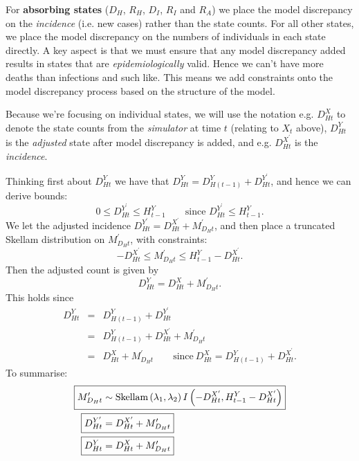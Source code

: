 \documentclass[a4paper]{article}
\begin{document}
For \textbf{absorbing states} ($D_H$, $R_H$, $D_I$, $R_I$ and $R_A$) we place the model discrepancy on the \textit{incidence} (i.e. new cases) rather than the state counts. For all other states, we place the model discrepancy on the numbers of individuals in each state directly. A key aspect is that we must ensure that any model discrepancy added results in states that are \textit{epidemiologically} valid. Hence we can't have more deaths than infections and such like. This means we add constraints onto the model discrepancy process based on the structure of the model.

Because we're focusing on individual states, we will use the notation e.g. $D^X_{Ht}$ to denote the state counts from the \textit{simulator} at time $t$ (relating to $X_t$ above), $D^Y_{Ht}$ is the \textit{adjusted} state after model discrepancy is added, and e.g. $D^{X^\prime}_{Ht}$ is the \textit{incidence}.

Thinking first about $D^Y_{Ht}$ we have that $D^Y_{Ht} = D^Y_{H(t - 1)} + D^{Y^\prime}_{Ht}$, and hence we can derive bounds:
\begin{equation*}
    0 \leq D^{Y^\prime}_{Ht} \leq H^Y_{t-1} \qquad \mbox{since $D^{Y^\prime}_{Ht} \leq H^Y_{t - 1}$}.
\end{equation*}
We let the adjusted incidence $D^{Y^\prime}_{Ht} = D^{X^\prime}_{Ht} + M^\prime_{D_Ht}$, and then place a truncated Skellam distribution on $M^\prime_{D_Ht}$, with constraints:
\begin{equation*}
    -D^{X^\prime}_{Ht} \leq M^\prime_{D_Ht} \leq H^Y_{t - 1} - D^{X^\prime}_{Ht}.
\end{equation*}
Then the adjusted count is given by
\begin{equation*}
    D^Y_{Ht} = D^X_{Ht} + M^\prime_{D_Ht}.
\end{equation*}
This holds since
\begin{eqnarray*}
    D^Y_{Ht} &=& D^Y_{H(t - 1)} + D^{Y^\prime}_{Ht}\\
    &=& D^Y_{H(t - 1)} + D^{X^\prime}_{Ht} + M^\prime_{D_Ht}\\
    &=& D^X_{Ht} + M^\prime_{D_Ht} \qquad \mbox{since}~D^X_{Ht} = D^Y_{H(t - 1)} + D^{X^\prime}_{Ht}.
\end{eqnarray*}
To summarise:
\begin{align*}
\Aboxed{M^\prime_{D_Ht} &\sim \mbox{Skellam}\left(\lambda_1, \lambda_2\right)I\left(-D^{X^\prime}_{Ht}, H^Y_{t - 1} - D^{X^\prime}_{Ht}\right)}\\
    \Aboxed{D^{Y^\prime}_{Ht} &= D^{X^\prime}_{Ht} + M^\prime_{D_Ht}}\\
    \Aboxed{D^Y_{Ht} &= D^X_{Ht} + M^\prime_{D_Ht}}
\end{align*}
\end{document}
